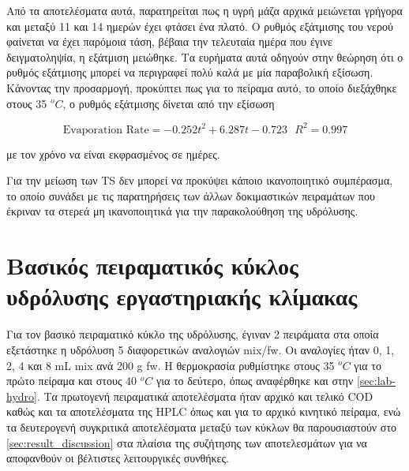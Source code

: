 \documentclass[11pt]{report}
\begin{document}
\begin{enumerate}
Από τα αποτελέσματα αυτά, παρατηρείται πως η υγρή μάζα αρχικά μειώνεται γρήγορα και μεταξύ 11 και 14 ημερών έχει φτάσει ένα πλατό. Ο ρυθμός εξάτμισης του νερού φαίνεται να έχει παρόμοια τάση, βέβαια την τελευταία ημέρα που έγινε δειγματοληψία, η εξάτμιση μειώθηκε. Τα ευρήματα αυτά οδηγούν στην θεώρηση ότι ο ρυθμός εξάτμισης μπορεί να περιγραφεί πολύ καλά με μία παραβολική εξίσωση. Κάνοντας την προσαρμογή, προκύπτει πως για το πείραμα αυτό, το οποίο διεξάχθηκε στους 35 \(^oC\), ο ρυθμός εξάτμισης δίνεται από την εξίσωση

\[ \text{Evaporation Rate} = -0.252t^2 + 6.287t - 0.723 ~ ~ ~ R^2 = 0.997 \]

με τον χρόνο να είναι εκφρασμένος σε ημέρες.

Για την μείωση των TS δεν μπορεί να προκύψει κάποιο ικανοποιητικό συμπέρασμα, το οποίο συνάδει με τις παρατηρήσεις των άλλων δοκιμαστικών πειραμάτων που έκριναν τα στερεά μη ικανοποιητικά για την παρακολούθηση της υδρόλυσης.
\end{enumerate}

\section{Βασικός πειραματικός κύκλος υδρόλυσης εργαστηριακής κλίμακας}
\label{sec:org626bfd2}
Για τον βασικό πειραματικό κύκλο της υδρόλυσης, έγιναν 2 πειράματα στα οποία εξετάστηκε η υδρόλυση 5 διαφορετικών αναλογιών \acrshort{mix}/\acrshort{fw}. Οι αναλογίες ήταν 0, 1, 2, 4 και 8 mL \acrshort{mix} ανά 200 g \acrshort{fw}. Η θερμοκρασία ρυθμίστηκε στους 35 \(^oC\) για το πρώτο πείραμα και στους 40 \(^oC\) για το δεύτερο, όπως αναφέρθηκε και στην \autoref{sec:lab-hydro}. Τα πρωτογενή πειραματικά αποτελέσματα ήταν αρχικό και τελικό COD καθώς και τα αποτελέσματα της HPLC όπως και για το αρχικό κινητικό πείραμα, ενώ τα δευτερογενή συγκριτικά αποτελέσματα μεταξύ των κύκλων θα παρουσιαστούν στο \autoref{sec:result_discussion} στα πλαίσια της συζήτησης των αποτελεσμάτων για να αποφανθούν οι βέλτιστες λειτουργικές συνθήκες.
\end{document}
